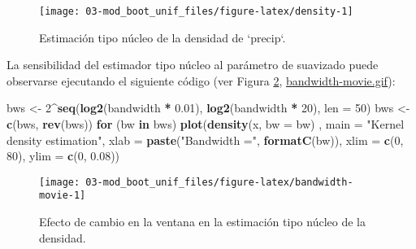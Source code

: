 \documentclass[
]{book}
\newenvironment{Shaded}{\begin{snugshade}}{\end{snugshade}}
\newcommand{\ControlFlowTok}[1]{\textcolor[rgb]{0.13,0.29,0.53}{\textbf{#1}}}
\newcommand{\DataTypeTok}[1]{\textcolor[rgb]{0.13,0.29,0.53}{#1}}
\newcommand{\DecValTok}[1]{\textcolor[rgb]{0.00,0.00,0.81}{#1}}
\newcommand{\FloatTok}[1]{\textcolor[rgb]{0.00,0.00,0.81}{#1}}
\newcommand{\KeywordTok}[1]{\textcolor[rgb]{0.13,0.29,0.53}{\textbf{#1}}}
\newcommand{\NormalTok}[1]{#1}
\newcommand{\OperatorTok}[1]{\textcolor[rgb]{0.81,0.36,0.00}{\textbf{#1}}}
\newcommand{\StringTok}[1]{\textcolor[rgb]{0.31,0.60,0.02}{#1}}
\theoremstyle{break}
\theoremstyle{definition}
\theoremstyle{definition}
\theoremstyle{definition}
\theoremstyle{remark}
\begin{document}
\begin{figure}[!htb]

{\centering \texttt{[image: 03-mod\_boot\_unif\_files/figure-latex/density-1]} 

}

\caption{Estimación tipo núcleo de la densidad de `precip`. }\label{fig:density}
\end{figure}

La sensibilidad del estimador tipo núcleo al parámetro de suavizado puede
observarse ejecutando el siguiente código (ver Figura \ref{fig:bandwidth-movie}, \href{./bandwidth-movie.gif}{bandwidth-movie.gif}):

\begin{Shaded}
\begin{Highlighting}[]
\NormalTok{bws <-}\StringTok{ }\DecValTok{2}\OperatorTok{^}\KeywordTok{seq}\NormalTok{(}\KeywordTok{log2}\NormalTok{(bandwidth }\OperatorTok{*}\StringTok{ }\FloatTok{0.01}\NormalTok{), }\KeywordTok{log2}\NormalTok{(bandwidth }\OperatorTok{*}\StringTok{ }\DecValTok{20}\NormalTok{), }\DataTypeTok{len =} \DecValTok{50}\NormalTok{)}
\NormalTok{bws <-}\StringTok{ }\KeywordTok{c}\NormalTok{(bws, }\KeywordTok{rev}\NormalTok{(bws))}
\ControlFlowTok{for}\NormalTok{ (bw }\ControlFlowTok{in}\NormalTok{ bws)}
  \KeywordTok{plot}\NormalTok{(}\KeywordTok{density}\NormalTok{(x, }\DataTypeTok{bw =}\NormalTok{ bw) , }\DataTypeTok{main =} \StringTok{"Kernel density estimation"}\NormalTok{, }
         \DataTypeTok{xlab =} \KeywordTok{paste}\NormalTok{(}\StringTok{"Bandwidth ="}\NormalTok{, }\KeywordTok{formatC}\NormalTok{(bw)), }
         \DataTypeTok{xlim =} \KeywordTok{c}\NormalTok{(}\DecValTok{0}\NormalTok{, }\DecValTok{80}\NormalTok{), }\DataTypeTok{ylim =} \KeywordTok{c}\NormalTok{(}\DecValTok{0}\NormalTok{, }\FloatTok{0.08}\NormalTok{))}
\end{Highlighting}
\end{Shaded}

\begin{figure}[!htb]

{\centering \texttt{[image: 03-mod\_boot\_unif\_files/figure-latex/bandwidth-movie-1]} 

}

\caption{Efecto de cambio en la ventana en la estimación tipo núcleo de la densidad.}\label{fig:bandwidth-movie}
\end{figure}
\end{document}
